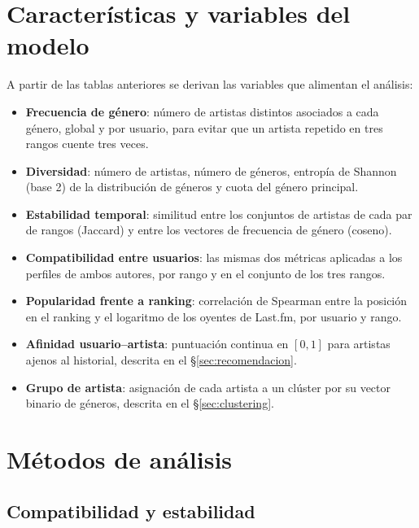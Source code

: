 \section{Características y variables del modelo}
\label{sec:caracteristicas}

A partir de las tablas anteriores se derivan las variables que alimentan el análisis:

\begin{itemize}
    \item \textbf{Frecuencia de género}: número de artistas distintos asociados a cada género, global y por usuario, para evitar que un artista repetido en tres rangos cuente tres veces.
    \item \textbf{Diversidad}: número de artistas, número de géneros, entropía de Shannon (base 2) de la distribución de géneros y cuota del género principal.
    \item \textbf{Estabilidad temporal}: similitud entre los conjuntos de artistas de cada par de rangos (Jaccard) y entre los vectores de frecuencia de género (coseno).
    \item \textbf{Compatibilidad entre usuarios}: las mismas dos métricas aplicadas a los perfiles de ambos autores, por rango y en el conjunto de los tres rangos.
    \item \textbf{Popularidad frente a ranking}: correlación de Spearman entre la posición en el ranking y el logaritmo de los oyentes de Last.fm, por usuario y rango.
    \item \textbf{Afinidad usuario--artista}: puntuación continua en $[0,1]$ para artistas ajenos al historial, descrita en el \S\ref{sec:recomendacion}.
    \item \textbf{Grupo de artista}: asignación de cada artista a un clúster por su vector binario de géneros, descrita en el \S\ref{sec:clustering}.
\end{itemize}

\section{Métodos de análisis}
\label{sec:metodos}

\subsection{Compatibilidad y estabilidad}
\label{sec:compatibilidad}

